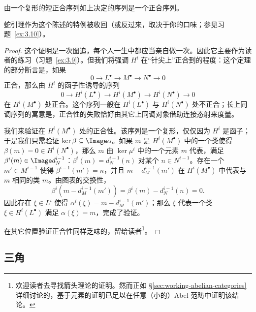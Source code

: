\begin{theorem}[上同调的长正合序列]
\label{thm:3.5-les}
由一个复形的短正合序列如上决定的序列是一个正合序列。
\end{theorem}

蛇引理作为这个陈述的特例被收回（或反过来，取决于你的口味；参见习题~\ref{ex:3.10}）。

\begin{proof}
这个证明是一次图追，每个人一生中都应当亲自做一次。因此它主要作为读者的练习（习题~\ref{ex:3.9}）。但我们将强调 $H^i$ 在“针尖上”正合到的程度：这个定理的部分断言是，如果
\[
0\longrightarrow L^\bullet\longrightarrow M^\bullet\longrightarrow N^\bullet\longrightarrow 0
\]
正合，那么由 $H^i$ 的函子性诱导的序列
\[
0\longrightarrow H^i(L^\bullet)\longrightarrow H^i(M^\bullet)\longrightarrow H^i(N^\bullet)\longrightarrow 0
\]
在 $H^i(M^\bullet)$ 处正合。这个序列一般在 $H^i(L^\bullet)$ 与 $H^i(N^\bullet)$ 处不正合；长上同调序列的寓意是，正合性的失败恰好由其它上同调对象借助连接态射来度量。

我们来验证在 $H^i(M^\bullet)$ 处的正合性。该序列是一个复形，仅仅因为 $H^i$ 是函子；于是我们只需验证 $\ker\beta\subseteq\Image\alpha$。如果 $m$ 是 $H^i(M^\bullet)$ 中的一个类使得 $\beta(m)=0\in H^i(N^\bullet)$，那么 $m$ 由 $\ker\mu^i$ 中的一个元素 $m$ 代表，满足 $\beta^i(m)\in\Image d_N^{i-1}$：$\beta^i(m)=d_N^{i-1}(n)$ 对某个 $n\in N^{i-1}$。存在一个 $m'\in M^{i-1}$ 使得 $\beta^{i-1}(m')=n$，并且 $m-d_M^{i-1}(m')$ 在 $H^i(M^\bullet)$ 中代表与 $m$ 相同的类 $m$。由图表的交换性，
\[
\beta^i(m-d_M^{i-1}(m'))=\beta^i(m)-d_N^{i-1}(n)=0.
\]
因此存在 $\xi\in L^i$ 使得 $\alpha^i(\xi)=m-d_M^{i-1}(m')$；那么 $\xi$ 代表一个类 $\xi\in H^i(L^\bullet)$ 满足 $\alpha(\xi)=m$，完成了验证。

在其它位置验证正合性同样乏味的，留给读者\footnote{欢迎读者去寻找箭头理论的证明。然而正如 \S\ref{sec:working-abelian-categories} 详细讨论的，基于元素的证明已足以在任意（小的）Abel 范畴中证明该结论。}。
\end{proof}

\subsection{三角}
\label{subsec:3.4-triangles}

